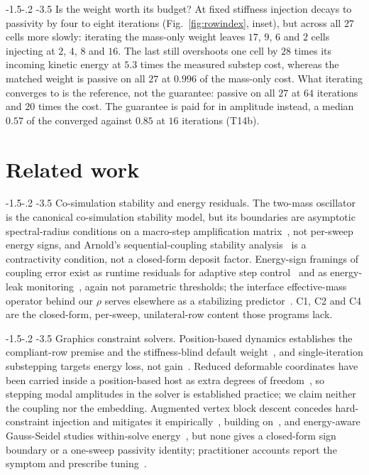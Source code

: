\documentclass[sigconf,screen,review,anonymous]{acmart}
\makeatletter
\newcommand{\rih}{\def\@toclevel{4}%
  \@startsection{paragraph}{4}{\parindent}%
  {-1.5\p@ \@plus -1\p@ \@minus -.2\p@}%
  {-3.5\p@}%
  {\ACM@NRadjust{\@parfont\@adddotafter}}}
\theoremstyle{acmdefinition}
\makeatother
\begin{document}
\rih{Is the weight worth its budget?} At fixed
stiffness injection decays to passivity by four to eight iterations
(Fig.~\ref{fig:rowindex}, inset), but across all $27$ cells more
slowly: iterating the mass-only weight leaves $17$,
$9$, $6$ and $2$ cells injecting at $2$, $4$, $8$ and $16$. The last still
overshoots one cell by $28$ times its incoming kinetic energy at $5.3$ times
the measured substep cost, whereas the matched weight is passive on all $27$ at
$0.996$ of the mass-only cost. What iterating converges to is
the reference, not the guarantee: passive on all $27$ at $64$ iterations and
$20$ times the cost. The guarantee is paid for in amplitude instead, a median
$0.57$ of the converged against $0.85$ at $16$ iterations (T14b).

\section{Related work}
\label{sec:related}
\rih{Co-simulation stability and energy residuals.} The two-mass
oscillator is the canonical co-simulation stability model, but its boundaries are
asymptotic spectral-radius conditions on a macro-step amplification
matrix~\citep{kubler2000coupling,gomes2018cosim}, not
per-sweep energy signs, and Arnold's sequential-coupling stability
analysis~\citep{arnold2010stability} is a contractivity condition, not a
closed-form deposit factor. Energy-sign framings of coupling error exist as
runtime residuals for adaptive step control~\citep{sadjina2016power} and as
energy-leak monitoring~\citep{gonzalez2019energyleak}, again not
parametric thresholds; the interface effective-mass operator behind our
$\rho$ serves elsewhere as a stabilizing predictor~\citep{peiret2018interface}.
C1, C2 and C4 are the closed-form, per-sweep, unilateral-row content those
programs lack.

\rih{Graphics constraint solvers.} Position-based dynamics establishes the
compliant-row premise and the stiffness-blind default
weight~\citep{macklin2016xpbd}, and single-iteration substepping targets energy
loss, not gain~\citep{macklin2019small}. Reduced deformable coordinates have
been carried inside a position-based host as extra degrees of
freedom~\citep{peng2024softrobot}, so stepping modal amplitudes in the solver is
established practice; we claim neither the coupling nor the embedding. Augmented
vertex block descent concedes hard-constraint injection and mitigates it
empirically~\citep{giles2025avbd}, building on~\citet{chen2024vbd}, and
energy-aware Gauss-Seidel studies
within-solve energy~\citep{cetinaslan2019energyaware}, but none gives a closed-form
sign boundary or a one-sweep passivity identity; practitioner accounts
report the symptom and prescribe tuning~\citep{catto2005iterative,catto2024solver2d}.
\end{document}
